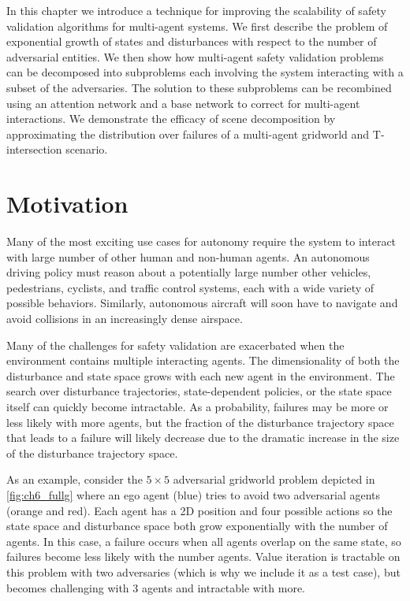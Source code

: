In this chapter we introduce a technique for improving the scalability of safety validation algorithms for multi-agent systems. We first describe the problem of exponential growth of states and disturbances with respect to the number of adversarial entities. We then show how multi-agent safety validation problems can be decomposed into subproblems each involving the system interacting with a subset of the adversaries. The solution to these subproblems can be recombined using an attention network and a base network to correct for multi-agent interactions. We demonstrate the efficacy of scene decomposition by approximating the distribution over failures of a multi-agent gridworld and T-intersection scenario. 

\section{Motivation}

Many of the most exciting use cases for autonomy require the system to interact with large number of other human and non-human agents. An autonomous driving policy must reason about a potentially large number other vehicles, pedestrians, cyclists, and traffic control systems, each with a wide variety of possible behaviors. Similarly, autonomous aircraft will soon have to navigate and avoid collisions in an increasingly dense airspace.

Many of the challenges for safety validation are exacerbated when the environment contains multiple interacting agents. The dimensionality of both the disturbance and state space grows with each new agent in the environment. The search over disturbance trajectories, state-dependent policies, or the state space itself can quickly become intractable. As a probability, failures may be more or less likely with more agents, but the fraction of the disturbance trajectory space that leads to a failure will likely decrease due to the dramatic increase in the size of the disturbance trajectory space. 

As an example, consider the $5 \times 5$ adversarial gridworld problem depicted in \cref{fig:ch6_fullg} where an ego agent (blue) tries to avoid two adversarial agents (orange and red).  Each agent has a 2D position and four possible actions so the state space and disturbance space both grow exponentially with the number of agents. In this case, a failure occurs when all agents overlap on the same state, so failures become less likely with the number agents. Value iteration is tractable on this problem with two adversaries (which is why we include it as a test case), but becomes challenging with \num{3} agents and intractable with more.

